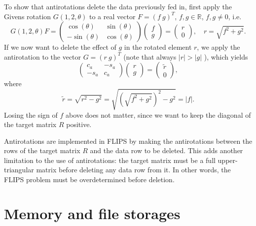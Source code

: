\documentclass[a4paper,twoside]{refrep}
\begin{document}
To show that antirotations delete the data previously fed in, first apply the Givens rotation $G(1,2,\theta)$ to a real vector $F = (f\:g)^T$, $f,g\in{\mathbb R}$, $f,g\neq 0$, i.e.
\begin{equation}
G(1,2,\theta)F =
\begin{pmatrix} \cos(\theta) & \sin(\theta) \\
-\sin(\theta) & \cos(\theta) \end{pmatrix}
\begin{pmatrix}f \\ g \end{pmatrix} = \begin{pmatrix}r \\ 0 \end{pmatrix}, \quad r =\sqrt{f^2 + g^2}.
\end{equation}
If we now want to delete the effect of $g$ in the rotated element $r$, we apply the antirotation to the vector $G=( r\:g)^T$ (note that always $|r|>|g|$ ), which yields
\begin{equation}
\begin{pmatrix}
c_a & -s_a \\ -s_a & c_a
\end{pmatrix}
\begin{pmatrix}
r \\ g
\end{pmatrix}
=
\begin{pmatrix}
\tilde{r} \\ 0
\end{pmatrix},
\end{equation}
where
\begin{equation}
\tilde{r} = \sqrt{r^2 - g^2} = \sqrt{\left(\sqrt{f^2 + g^2}\right)^2 - g^2} = |f|.
\end{equation}
Losing the sign of $f$ above does not matter, since we want to keep the diagonal of the target matrix $R$ positive.

Antirotations are implemented in FLIPS by making the antirotations between the rows of the target matrix $R$ and the data row to be deleted. This adds another limitation to the use of antirotations: the target matrix must be a full upper-triangular matrix before deleting any data row from it. In other words, the FLIPS problem must be overdetermined before deletion.



\section{Memory and file storages}\label{storage}
\end{document}

